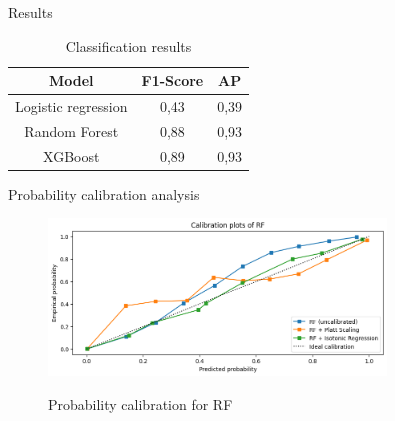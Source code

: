 \documentclass{beamer}
\begin{document}
\begin{frame}{Results}
\begin{table}[h]
  \centering
  \caption{Classification results}
  \label{tab:Results}
  \begin{tabular}{|c|c|c|}
        \toprule
        \textbf{Model} & \textbf{F1-Score} & \textbf{AP}  \\
        \midrule
        Logistic regression & 0,43 & 0,39  \\
        Random Forest & 0,88 & 0,93  \\
        XGBoost & 0,89 & 0,93  \\
        \bottomrule
  \end{tabular}
\end{table}
\end{frame}





\begin{frame}{Probability calibration analysis}
\begin{figure}[h]
    \centering
    \includegraphics[width=0.8\textwidth]{Calibration_plot_RF.png}\\
    \caption{Probability calibration for RF}
    \label{fig:Probability calibration for rf}
\end{figure}
\end{frame}
\end{document}

